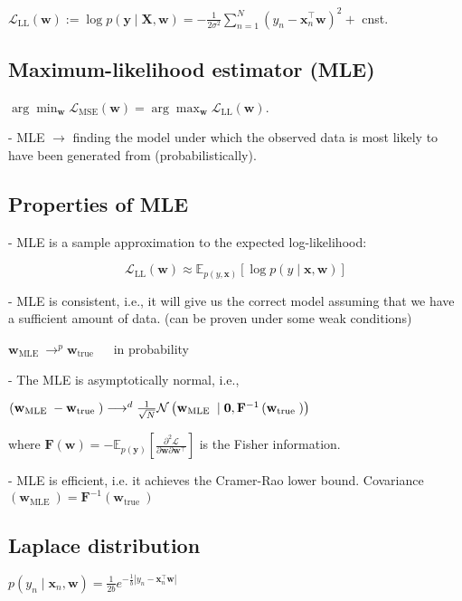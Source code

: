 $\mathcal{L}_{\mathrm{LL}}(\mathbf{w}):=\log p(\mathbf{y} \mid \mathbf{X}, \mathbf{w})=-\frac{1}{2 \sigma^{2}} \sum_{n=1}^{N}\left(y_{n}-\mathbf{x}_{n}^{\top} \mathbf{w}\right)^{2}+$ cnst.

\subsection*{Maximum-likelihood estimator (MLE)}

$\arg \min _{\mathbf{w}} \mathcal{L}_{\mathrm{MSE}}(\mathbf{w})=\arg \max _{\mathbf{w}} \mathcal{L}_{\mathrm{LL}}(\mathbf{w})$.

- MLE $\rightarrow$ finding the model under which the observed data is most likely to have been generated from (probabilistically).

\subsection*{Properties of MLE}
- MLE is a sample approximation to the expected log-likelihood:

$$
\mathcal{L}_{\mathrm{LL}}(\mathbf{w}) \approx \mathbb{E}_{p(y, \mathbf{x})}[\log p(y \mid \mathbf{x}, \mathbf{w})]
$$

- MLE is consistent, i.e., it will give us the correct model assuming that we have a sufficient amount of data. (can be proven under some weak conditions)

$\mathbf{w}_{\text {MLE }} \longrightarrow^{p} \mathbf{w}_{\text {true }} \quad$ in probability

- The MLE is asymptotically normal, i.e.,

$\left(\mathbf{w}_{\text {MLE }}-\mathbf{w}_{\text {true }}\right) \longrightarrow^{d}\\ \frac{1}{\sqrt{N}} \mathcal{N}\left(\mathbf{w}_{\text {MLE }} \mid \mathbf{0}, \mathbf{F}^{-1}\left(\mathbf{w}_{\text {true }}\right)\right)$

where $\mathbf{F}(\mathbf{w})=-\mathbb{E}_{p(\mathbf{y})}\left[\frac{\partial^{2} \mathcal{L}}{\partial \mathbf{w} \partial \mathbf{w}^{\top}}\right]$ is the Fisher information.

- MLE is efficient, i.e. it achieves the Cramer-Rao lower bound. Covariance $\left(\mathbf{w}_{\text {MLE }}\right)=\mathbf{F}^{-1}\left(\mathbf{w}_{\text {true }}\right)$

\subsection*{Laplace distribution}
$
p\left(y_{n} \mid \mathbf{x}_{n}, \mathbf{w}\right)=\frac{1}{2 b} e^{-\frac{1}{b}\left|y_{n}-\mathbf{x}_{n}^{\top} \mathbf{w}\right|}
$
